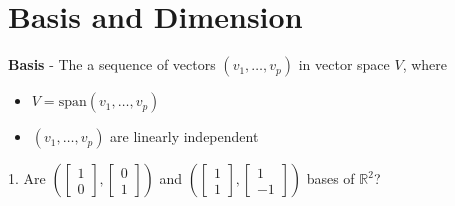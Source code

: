 \section{Basis and Dimension}
\textbf{Basis} - The a sequence of vectors $(v_1, \dots, v_p)$ in vector space $V$, where 
\begin{itemize}
  \item $V = \text{span}(v_1, \dots, v_p)$ 
  \item $(v_1, \dots, v_p)$ are linearly independent 
\end{itemize}
1. Are $(\begin{bmatrix}1 \\ 0\end{bmatrix}, \begin{bmatrix}0 \\ 1\end{bmatrix})$ and 
$(\begin{bmatrix}1 \\ 1\end{bmatrix}, \begin{bmatrix}1 \\ -1\end{bmatrix})$ bases of 
$\mathbb{R}^2$?
